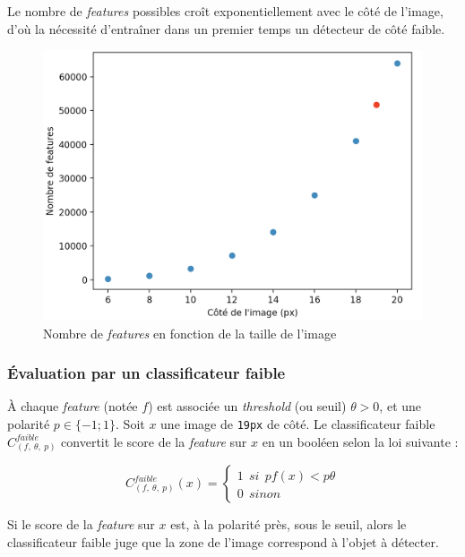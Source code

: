 \documentclass[12pt,a4paper]{article}
\begin{document}
Le nombre de \textit{features} possibles croît exponentiellement avec le côté de l'image, d'où la nécessité d'entraîner dans un premier temps un détecteur de côté faible.

\begin{figure}
    \includegraphics[scale = 0.35]{nombre_features_cut}
    \centering
    \caption{Nombre de \textit{features} en fonction de la taille de l'image}
\end{figure}

\subsubsection{Évaluation par un classificateur faible}
À chaque \textit{feature} (notée $f$) est associée un \textit{threshold} (ou seuil) $\theta > 0$, et une polarité $p \in \{-1 ; 1\}$. Soit $x$ une image de \texttt{19px} de côté. Le classificateur faible $C_{(f, \: \theta, \: p)}^{faible}$ convertit le score de la \textit{feature} sur $x$ en un booléen selon la loi suivante :

\begin{equation}
    C_{(f, \: \theta, \: p)}^{faible}(x) = 
        \begin{cases}
        1 \:\: si \:\: pf(x) < p\theta \\
        0 \:\: sinon
        \end{cases}
\end{equation}

Si le score de la \textit{feature} sur $x$ est, à la polarité près, sous le seuil, alors le classificateur faible juge que la zone de l'image correspond à l'objet à détecter.
\end{document}
